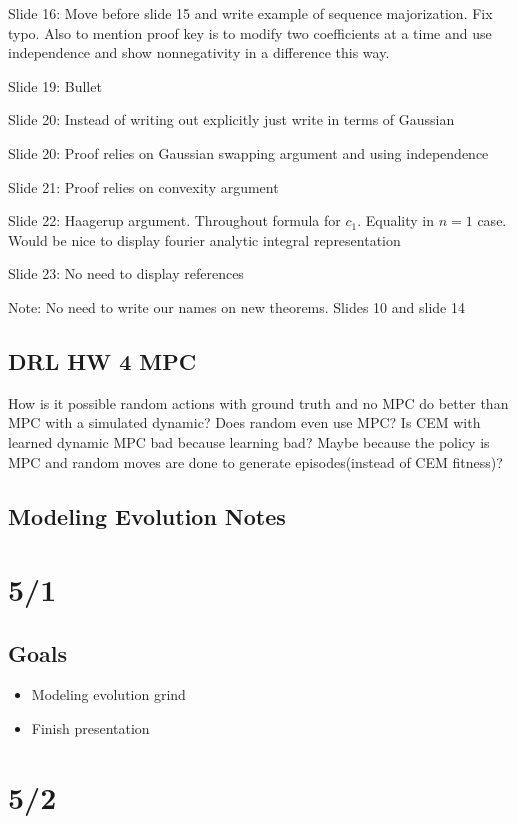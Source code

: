 \documentclass[11pt]{article}
\theoremstyle{remark}
\begin{document}
Slide 16: Move before slide 15 and write example of sequence majorization. Fix typo. Also to mention proof key is to modify two coefficients at a time and use independence and show nonnegativity in a difference this way.

Slide 19: Bullet

Slide 20: Instead of writing out explicitly just write in terms of Gaussian

Slide 20: Proof relies on Gaussian swapping argument and using independence

Slide 21: Proof relies on convexity argument

Slide 22: Haagerup argument. Throughout formula for $c_1$. Equality in $n=1$ case. Would be nice to display fourier analytic integral representation

Slide 23: No need to display references

Note: No need to write our names on new theorems. Slides 10 and slide 14 

\subsection{DRL HW 4 MPC}

How is it possible random actions with ground truth and no MPC do better than MPC with a simulated dynamic? Does random even use MPC? Is CEM with learned dynamic MPC bad because learning bad? Maybe because the policy is MPC and random moves are done to generate episodes(instead of CEM fitness)?

\subsection{Modeling Evolution Notes}

\section{5/1}

\subsection{Goals}

\begin{itemize}
	\item Modeling evolution grind
	\item Finish presentation
\end{itemize}

\section{5/2}
\end{document}
